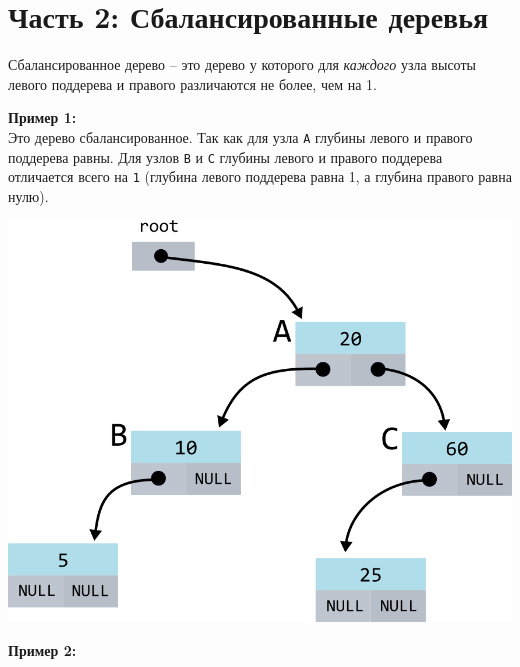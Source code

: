 \documentclass{article}
\begin{document}
\section*{Часть 2: Сбалансированные деревья} 
Сбалансированное дерево -- это дерево у которого для \textit{каждого} узла высоты левого поддерева и правого различаются не более, чем на 1.
\begin{multicols}{2}

\textbf{Пример 1:}\\

Это дерево сбалансированное. Так как для узла \texttt{A} глубины левого и правого поддерева равны.
Для узлов \texttt{B} и \texttt{C} глубины левого и правого поддерева отличается всего на \texttt{1} 
(глубина левого поддерева равна 1, а глубина правого равна нулю).

\begin{center}
\includegraphics[scale=0.8]{../images/balanced_tree.png}
\end{center}
\vfill\null
\columnbreak

\textbf{Пример 2:} \\


\end{multicols}
\end{document}
